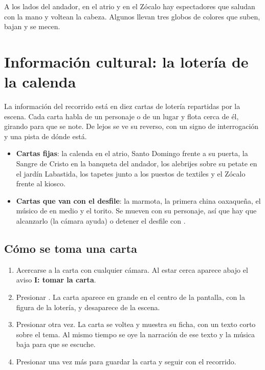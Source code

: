\documentclass[11pt,a4paper]{article}
\begin{document}


A los lados del andador, en el atrio y en el Zócalo hay espectadores que saludan con la mano y voltean la cabeza. Algunos llevan tres globos de colores que suben, bajan y se mecen.

\section{Información cultural: la lotería de la calenda}
\label{sec:cartas}

La información del recorrido está en diez cartas de lotería repartidas por la escena. Cada carta habla de un personaje o de un lugar y flota cerca de él, girando para que se note. De lejos se ve su reverso, con un signo de interrogación y una pista de dónde está.

\begin{itemize}
  \item \textbf{Cartas fijas}: la calenda en el atrio, Santo Domingo frente a su puerta, la Sangre de Cristo en la banqueta del andador, los alebrijes sobre su petate en el jardín Labastida, los tapetes junto a los puestos de textiles y el Zócalo frente al kiosco.
  \item \textbf{Cartas que van con el desfile}: la marmota, la primera china oaxaqueña, el músico de en medio y el torito. Se mueven con su personaje, así que hay que alcanzarlo (la cámara  ayuda) o detener el desfile con .
\end{itemize}

\subsection{Cómo se toma una carta}

\begin{enumerate}
  \item Acercarse a la carta con cualquier cámara. Al estar cerca aparece abajo el aviso \textbf{I: tomar la carta}.
  \item Presionar . La carta aparece en grande en el centro de la pantalla, con la figura de la lotería, y desaparece de la escena.
  \item Presionar  otra vez. La carta se voltea y muestra su ficha, con un texto corto sobre el tema. Al mismo tiempo se oye la narración de ese texto y la música baja para que se escuche.
  \item Presionar  una vez más para guardar la carta y seguir con el recorrido.
\end{enumerate}
\end{document}
